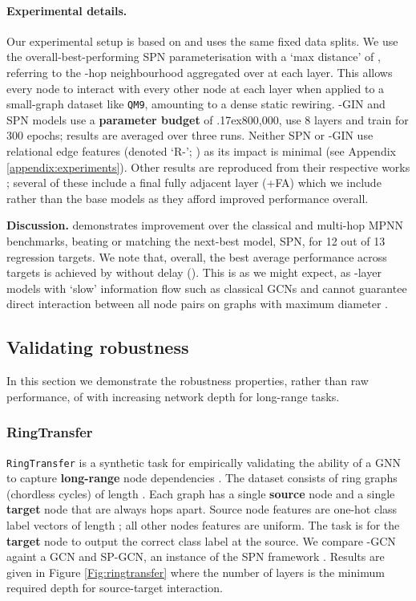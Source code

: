 \documentclass{article}
\newcommand{\mytilde}{\raise.17ex\hbox{}}
\theoremstyle{plain}
\theoremstyle{definition}
\theoremstyle{remark}
\begin{document}
\paragraph{Experimental details.} Our experimental setup is based on \citet{brockschmidt2020gnn} and uses the same fixed data splits. We use the overall-best-performing SPN parameterisation with a `max distance' of , referring to the -hop neighbourhood aggregated over at each layer. This allows every node to interact with every other node at each layer when applied to a small-graph dataset like \texttt{QM9}, amounting to a dense static rewiring.
-GIN and SPN models use a {\bf parameter budget} of \mytilde800,000, use 8 layers and train for 300 epochs; results are averaged over three runs. Neither SPN or -GIN use relational edge features (denoted `R-'; \citet{schlichtkrull2018modeling, brockschmidt2020gnn}) as its impact is minimal (see Appendix \ref{appendix:experiments}). Other results are reproduced from their respective works \citep{brockschmidt2020gnn, alon2020bottleneck}; several of these include a final fully adjacent layer (+FA) which we include rather than the base models as they afford improved performance overall.


\textbf{Discussion.}  demonstrates improvement over the classical and multi-hop MPNN benchmarks, beating or matching the next-best model, SPN, for 12 out of 13 regression targets. We note that, overall, the best average performance across targets is achieved by  without delay ().
This is as we might expect, as -layer models with `slow' information flow such as classical GCNs and  cannot guarantee direct interaction between all node pairs on graphs with maximum diameter .

\subsection{Validating robustness}
In this section we demonstrate the robustness properties, rather than raw performance, of  with increasing network depth for long-range tasks.

\subsubsection{RingTransfer}
\texttt{RingTransfer} is a synthetic task for empirically validating the ability of a GNN to capture {\bf long-range} node dependencies \cite{bodnar2021weisfeilercell}. The dataset consists of  ring graphs (chordless cycles) of length . Each graph has a single \textbf{source} node and a single \textbf{target} node that are always  hops apart. Source node features are one-hot class label vectors of length ; all other nodes features are uniform. The task is for the \textbf{target} node to output the correct class label at the source. We compare -GCN againt a GCN and SP-GCN, an instance of the SPN framework \cite{abboud2022shortest}. Results are given in Figure \ref{Fig:ringtransfer} where the number of layers  is the minimum required depth for source-target interaction. 
\end{document}
